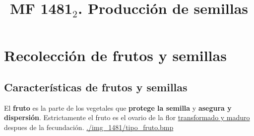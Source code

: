 \documentclass[a4paper,12pt,oneside]{book}
\date{}
\title{MF 1481\(_{\text{2}}\). Producción de semillas}
\begin{document}
\maketitle
\thispagestyle{empty} \tableofcontents \clearpage\chapter{Recolección de frutos y semillas}
\label{sec:org077f477}
\section{Características de frutos y semillas}
\label{sec:orged7a4e6}
El \textbf{fruto} es la parte de los vegetales que \textbf{protege la semilla} y \textbf{asegura y
dispersión}. Estrictamente el fruto es el ovario de la flor \uline{transformado y
maduro} despues de la fecundación.
\url{./img\_1481/tipo\_fruto.bmp}
\end{document}
